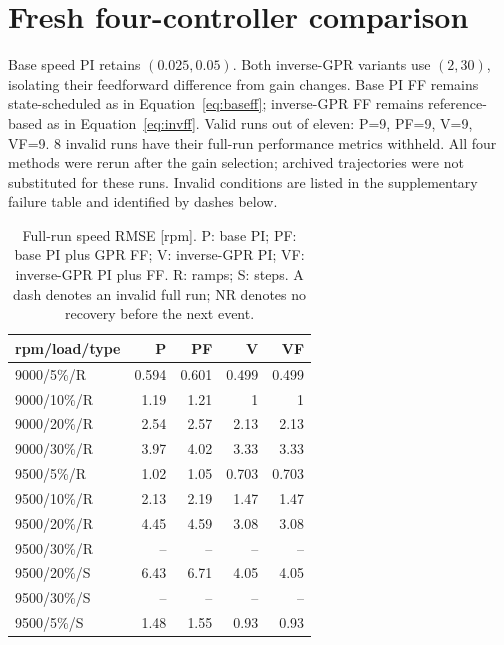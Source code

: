 \documentclass[11pt,a4paper]{article}
\begin{document}
\clearpage\section{Fresh four-controller comparison}
Base speed PI retains $(0.025,0.05)$. Both inverse-GPR variants use $(2,30)$, isolating their feedforward difference from gain changes. Base PI FF remains state-scheduled as in Equation~\eqref{eq:baseff}; inverse-GPR FF remains reference-based as in Equation~\eqref{eq:invff}.
Valid runs out of eleven: P=9, PF=9, V=9, VF=9. 8 invalid runs have their full-run performance metrics withheld. All four methods were rerun after the gain selection; archived trajectories were not substituted for these runs. Invalid conditions are listed in the supplementary failure table and identified by dashes below.
\begin{table}[H]\centering\small
\begin{tabular}{@{}lrrrr@{}}\toprule
rpm/load/type & P & PF & V & VF\\\midrule
9000/5\%/R & 0.594 & 0.601 & 0.499 & 0.499\\
9000/10\%/R & 1.19 & 1.21 & 1 & 1\\
9000/20\%/R & 2.54 & 2.57 & 2.13 & 2.13\\
9000/30\%/R & 3.97 & 4.02 & 3.33 & 3.33\\
9500/5\%/R & 1.02 & 1.05 & 0.703 & 0.703\\
9500/10\%/R & 2.13 & 2.19 & 1.47 & 1.47\\
9500/20\%/R & 4.45 & 4.59 & 3.08 & 3.08\\
9500/30\%/R & -- & -- & -- & --\\
9500/20\%/S & 6.43 & 6.71 & 4.05 & 4.05\\
9500/30\%/S & -- & -- & -- & --\\
9500/5\%/S & 1.48 & 1.55 & 0.93 & 0.93\\
\bottomrule\end{tabular}\caption{Full-run speed RMSE [rpm]. P: base PI; PF: base PI plus GPR FF; V: inverse-GPR PI; VF: inverse-GPR PI plus FF. R: ramps; S: steps. A dash denotes an invalid full run; NR denotes no recovery before the next event.}\end{table}
\end{document}
